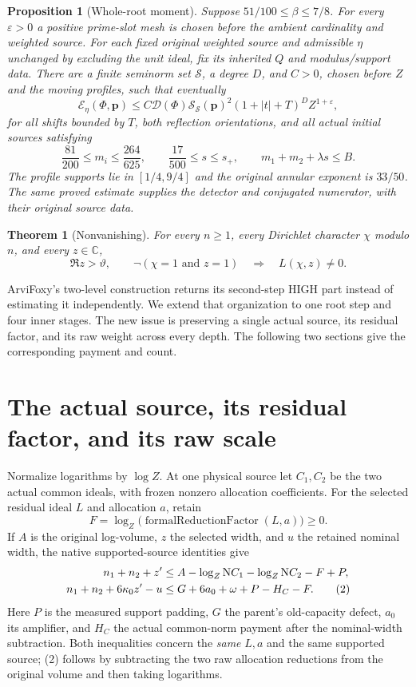 \documentclass[10pt,a4paper]{article}
\newcommand{\N}{\mathrm N}\newcommand{\E}{\mathcal E}
\newcommand{\tht}{\vartheta}\newcommand{\kap}{\kappa}
\newcommand{\cS}{\mathcal S}\newcommand{\cD}{\mathcal D}
\newtheorem{theorem}{Theorem}\newtheorem{lemma}{Lemma}
\newtheorem{proposition}{Proposition}
\begin{document}
\begin{proposition}[Whole-root moment]\label{prop:moment}
Suppose $51/100\le\beta\le7/8$. For every $\varepsilon>0$ a positive
prime-slot mesh is chosen before the ambient cardinality and weighted source.
For each fixed original weighted source and admissible $\eta$ unchanged by
excluding the unit ideal, fix its inherited $Q$ and modulus/support data.
There are a finite seminorm set
$\mathscr S$, a degree $D$, and $C>0$, chosen before $Z$ and the moving
profiles, such that eventually
\[
 \E_\eta(\Phi,\mathbf p)
 \le C\cD(\Phi)\cS_{\mathscr S}(\mathbf p)^2
       (1+|t|+T)^D Z^{1+\varepsilon},                 \tag{M}
\]
for all shifts bounded by $T$, both reflection orientations, and all actual
initial sources satisfying
\[
 \frac{81}{200}\le m_i\le\frac{264}{625},\qquad
 \frac{17}{500}\le s\le s_+,\qquad m_1+m_2+\lambda s\le B.
\]
The profile supports lie in $[1/4,9/4]$ and the original annular exponent is
$33/50$. The same proved estimate supplies the detector and conjugated
numerator, with their original source data.\end{proposition}

\begin{theorem}[Nonvanishing]\label{thm:endpoint}
For every $n\ge1$, every
Dirichlet character $\chi$ modulo $n$, and every $z\in\mathbb C$,
\[
 \Re z>\tht,\qquad \neg(\chi=1\text{ and }z=1)
 \quad\Longrightarrow\quad L(\chi,z)\ne0.
\]
\end{theorem}
ArviFoxy's two-level construction \cite{arvi} returns its second-step HIGH
part instead of estimating it independently. We extend that organization to
one root step and four inner stages. The new issue is preserving a single
actual source, its residual factor, and its raw weight across every depth.
The following two sections give the corresponding payment and count.

\newpage
\section{The actual source, its residual factor, and its raw scale}
Normalize logarithms by $\log Z$. At one physical source let $C_1,C_2$ be
the two actual common ideals, with frozen nonzero allocation coefficients.
For the selected residual ideal $L$ and allocation $a$, retain
\[
 F=\log_Z\!\bigl(\operatorname{formalReductionFactor}(L,a)\bigr)\ge0.
\]
If $A$ is the original log-volume, $z$ the selected width, and $u$ the
retained nominal width, the native supported-source identities give
\begin{align}
 n_1+n_2+z'&\le A-\log_Z\N C_1-\log_Z\N C_2-F+P,\notag\\
 n_1+n_2+6\kap_0z'-u
 &\le G+6a_0+\omega+P-H_C-F.                         \tag{2}
\end{align}
Here $P$ is the measured support padding, $G$ the parent's old-capacity
defect, $a_0$ its amplifier, and $H_C$ the actual common-norm payment after
the nominal-width subtraction. Both inequalities concern the \emph{same}
$L,a$ and the same supported source; (2) follows by subtracting the two raw
allocation reductions from the original volume and then taking logarithms.
\end{document}

